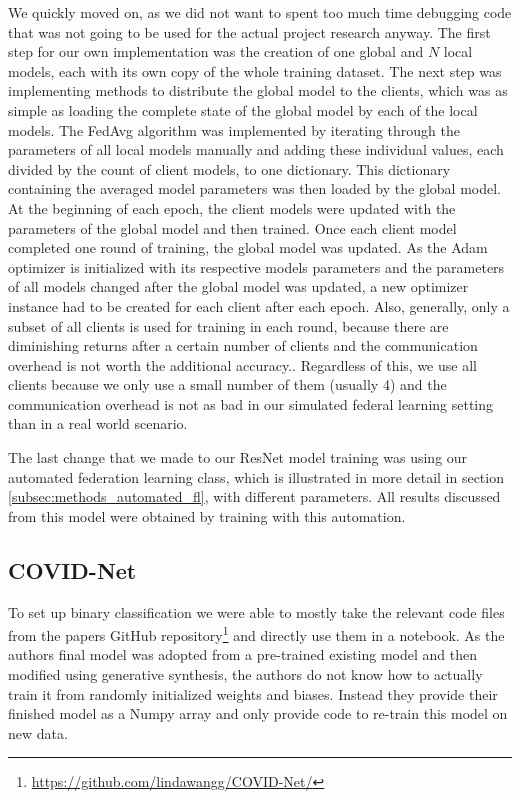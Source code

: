 We quickly moved on, as we did not want to spent too much time debugging code that was not going to be used for the actual project research anyway. The first step for our own implementation was the creation of one global and $N$ local models, each with its own copy of the whole training dataset.
The next step was implementing methods to distribute the global model to the clients, which was as simple as loading the complete state of the global model by each of the local models. The FedAvg algorithm was implemented by iterating through the parameters of all local models manually and adding these individual values, each divided by the count of client models, to one dictionary. This dictionary containing the averaged model parameters was then loaded by the global model.
At the beginning of each epoch, the client models were updated with the parameters of the global model and then trained. Once each client model completed one round of training, the global model was updated.
As the Adam optimizer is initialized with its respective models parameters and the parameters of all models changed after the global model was updated, a new optimizer instance had to be created for each client after each epoch.
Also, generally, only a subset of all clients is used for training in each round, because there are diminishing returns after a certain number of clients and the communication overhead is not worth the additional accuracy.\cite{fl_paper}. Regardless of this, we use all clients because we only use a small number of them (usually 4) and the communication overhead is not as bad in our simulated federal learning setting than in a real world scenario.

The last change that we made to our ResNet model training was using our automated federation learning class, which is illustrated in more detail in section \ref{subsec:methods_automated_fl}, with different parameters. All results discussed from this model were obtained by training with this automation.

\subsection{COVID-Net}\label{subsec:dev_covidnet}
To set up binary classification we were able to mostly take the relevant code files from the papers GitHub repository\footnote{\url{https://github.com/lindawangg/COVID-Net/}} and directly use them in a notebook. As the authors final model was adopted from a pre-trained existing model and then modified using generative synthesis, the authors do not know how to actually train it from randomly initialized weights and biases. Instead they provide their finished model as a Numpy array and only provide code to re-train this model on new data. 

